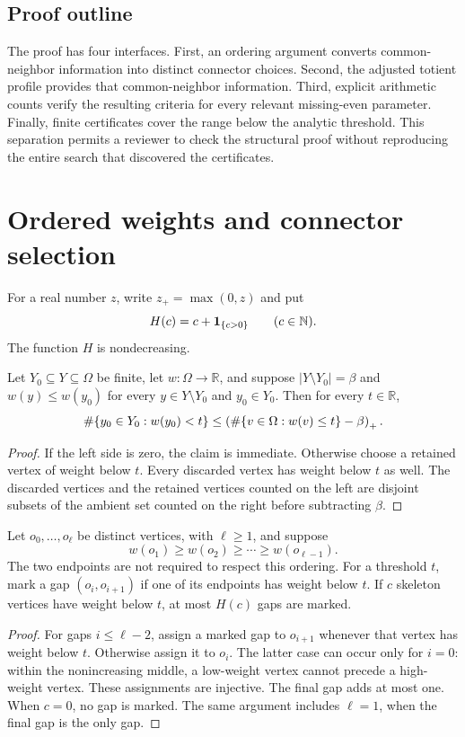 \subsection{Proof outline}
The proof has four interfaces. First, an ordering argument converts common-neighbor information into distinct connector choices. Second, the adjusted totient profile provides that common-neighbor information. Third, explicit arithmetic counts verify the resulting criteria for every relevant missing-even parameter. Finally, finite certificates cover the range below the analytic threshold. This separation permits a reviewer to check the structural proof without reproducing the entire search that discovered the certificates.

\section{Ordered weights and connector selection}\label{sec:method}
For a real number $z$, write $z_+=\max(0,z)$ and put
\[
 H(c)=c+\mathbf 1_{\{c>0\}}\qquad(c\in\mathbb N).
\]
The function $H$ is nondecreasing.

\begin{lemma}\label{lem:tail}
Let $Y_0\subseteq Y\subseteq\Omega$ be finite, let $w:\Omega\to\mathbb R$, and suppose
$|Y\setminus Y_0|=\beta$ and $w(y)\le w(y_0)$ for every $y\in Y\setminus Y_0$ and $y_0\in Y_0$. Then for every $t\in\mathbb R$,
\[
\#\{y_0\in Y_0:w(y_0)<t\}
\le\left(\#\{v\in\Omega:w(v)\le t\}-\beta\right)_{+}.
\]
\end{lemma}
\begin{proof}
If the left side is zero, the claim is immediate. Otherwise choose a retained vertex of weight below $t$. Every discarded vertex has weight below $t$ as well. The discarded vertices and the retained vertices counted on the left are disjoint subsets of the ambient set counted on the right before subtracting $\beta$.
\end{proof}

\begin{lemma}\label{lem:gaps}
Let $o_0,\ldots,o_\ell$ be distinct vertices, with $\ell\ge1$, and suppose
\[
 w(o_1)\ge w(o_2)\ge\cdots\ge w(o_{\ell-1}).
\]
The two endpoints are not required to respect this ordering. For a threshold $t$, mark a gap $(o_i,o_{i+1})$ if one of its endpoints has weight below $t$. If $c$ skeleton vertices have weight below $t$, at most $H(c)$ gaps are marked.
\end{lemma}
\begin{proof}
For gaps $i\le\ell-2$, assign a marked gap to $o_{i+1}$ whenever that vertex has weight below $t$. Otherwise assign it to $o_i$. The latter case can occur only for $i=0$: within the nonincreasing middle, a low-weight vertex cannot precede a high-weight vertex. These assignments are injective. The final gap adds at most one. When $c=0$, no gap is marked. The same argument includes $\ell=1$, when the final gap is the only gap.
\end{proof}

